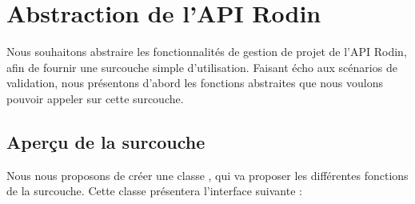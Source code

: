 \chapter{Abstraction de l'API Rodin}\label{sec:apihandle}

Nous souhaitons abstraire les fonctionnalités de gestion de projet de l'API Rodin, afin de fournir une surcouche simple d'utilisation.
Faisant écho aux scénarios de validation, nous présentons d'abord les fonctions abstraites que nous voulons pouvoir appeler sur cette surcouche.


\section{Aperçu de la surcouche}

Nous nous proposons de créer une classe , qui va proposer les différentes fonctions de la surcouche.
Cette classe présentera l'interface suivante :


